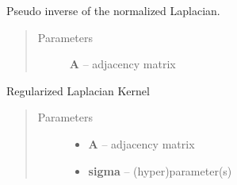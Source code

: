 \documentclass[letterpaper,10pt,english]{sphinxmanual}
\begin{document}

\begin{fulllineitems}
\label{Graph:pyGPs.GraphStuff.kernels_on_graph.psInvLapKernel}
Pseudo inverse of the normalized Laplacian.
\begin{quote}\begin{description}
\item[{Parameters}] \leavevmode
\textbf{A} -- adjacency matrix

\end{description}\end{quote}

\end{fulllineitems}


\begin{fulllineitems}
\label{Graph:pyGPs.GraphStuff.kernels_on_graph.regLapKernel}
Regularized Laplacian Kernel
\begin{quote}\begin{description}
\item[{Parameters}] \leavevmode\begin{itemize}
\item {} 
\textbf{A} -- adjacency matrix

\item {} 
\textbf{sigma} -- (hyper)parameter(s)

\end{itemize}

\end{description}\end{quote}

\end{fulllineitems}

\end{document}
